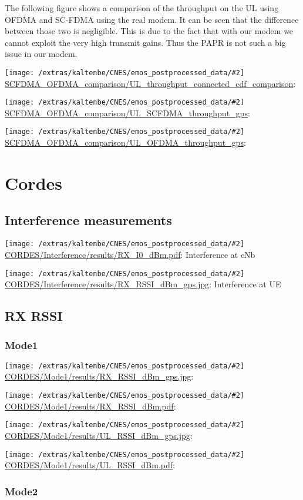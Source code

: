 \documentclass[a4paper,10pt]{article}
\newcommand{\printfile}[2][]{
 \begin{minipage}{8cm}
  \centering
  \texttt{[image: /extras/kaltenbe/CNES/emos\_postprocessed\_data/\#2]}
  \url{#2}: #1

 \end{minipage}
}
\begin{document}
The following figure shows a comparison of the throughput on the UL using OFDMA and SC-FDMA using the real modem. It can be seen that the difference between those two is negligible. This is due to the fact that with our modem we cannot exploit the very high transmit gains. Thus the PAPR is not such a big issue in our modem. 


\printfile{SCFDMA_OFDMA_comparison/UL_throughput_connected_cdf_comparison}

\printfile{SCFDMA_OFDMA_comparison/UL_SCFDMA_throughput_gps}
\printfile{SCFDMA_OFDMA_comparison/UL_OFDMA_throughput_gps}


\section{Cordes}
\label{sec:cordes}

\subsection{Interference measurements}

\printfile[Interference at eNb]{CORDES/Interference/results/RX_I0_dBm.pdf}
\printfile[Interference at UE]{CORDES/Interference/results/RX_RSSI_dBm_gps.jpg}


\subsection{RX RSSI}


%  

\subsubsection{Mode1}
\printfile{CORDES/Mode1/results/RX_RSSI_dBm_gps.jpg}
\printfile{CORDES/Mode1/results/RX_RSSI_dBm.pdf}

\printfile{CORDES/Mode1/results/UL_RSSI_dBm_gps.jpg}
\printfile{CORDES/Mode1/results/UL_RSSI_dBm.pdf}

\subsubsection{Mode2}
\end{document}
